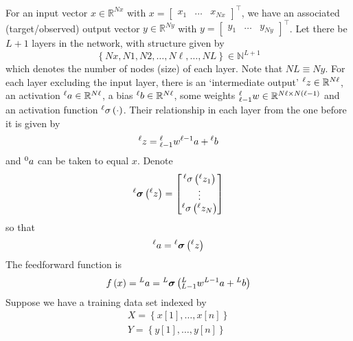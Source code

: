\documentclass[11pt]{report} %
\begin{document}
For an input vector $x\in\mathbb{R}^{Nx}$ with $x=\begin{bmatrix}x_{1} & \dots & x_{Nx}\end{bmatrix}^{\top}$, we have an associated (target/observed) output vector $y\in\mathbb{R}^{Ny}$ with $y=\begin{bmatrix}y_{1} & \dots & y_{Ny}\end{bmatrix}^{\top}$. Let there be $L + 1$ layers in the network, with structure given by
\begin{equation}
\left\{Nx,N1,N2,\dots,N\ell,\dots,NL\right\} \in \mathbb{N}^{L + 1}
\end{equation}
which denotes the number of nodes (size) of each layer. Note that $NL\equiv Ny$. For each layer excluding the input layer, there is an `intermediate output' $\mathstrut^{\ell}z\in\mathbb{R}^{N\ell}$, an activation $\mathstrut^{\ell}a\in\mathbb{R}^{N\ell}$, a bias $\mathstrut^{\ell}b\in\mathbb{R}^{N\ell}$, some weights $\mathstrut_{\ell-1}^{\ell}w\in\mathbb{R}^{N\ell\times N\left(\ell-1\right)}$ and an activation function $\mathstrut^{\ell}\sigma\left(\cdot\right)$. Their relationship in each layer from the one before it is given by
\begin{equation}
\mathstrut^{\ell}z=\mathstrut_{\ell-1}^{\ell}w\mathstrut^{\ell-1}a+\mathstrut^{\ell}b
\end{equation}
and $\mathstrut^{0}a$ can be taken to equal $x$. Denote
\begin{equation}
\mathstrut^{\ell}\boldsymbol{\sigma}\left(\mathstrut^{\ell}z\right)=\begin{bmatrix}\mathstrut^{\ell}\sigma\left(\mathstrut^{\ell} z_{1}\right)\\
\vdots\\
\mathstrut^{\ell}\sigma\left(\mathstrut^{\ell}z_{N}\right)
\end{bmatrix}
\end{equation}
so that
\begin{equation}
\mathstrut^{\ell}a=\mathstrut^{\ell}\boldsymbol{\sigma}\left(\mathstrut^{\ell}z\right)
\end{equation}
The feedforward function is
\begin{equation}
f\left(x\right)=\mathstrut^{L}a=\mathstrut^{L}\boldsymbol{\sigma}\left(\mathstrut_{L-1}^{L}w\mathstrut^{L-1}a+\mathstrut^{L}b\right)
\end{equation}
Suppose we have a training data set indexed by
\begin{gather}
X=\left\{ x\left[1\right],\dots,x\left[n\right]\right\} \\
Y=\left\{ y\left[1\right],\dots,y\left[n\right]\right\} 
\end{gather}
\end{document}
